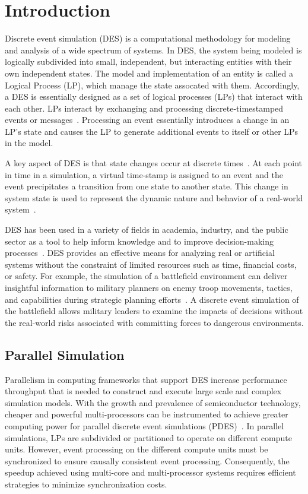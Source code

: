 \chapter{Introduction} 

Discrete event simulation (DES) is a computational methodology for
modeling and analysis of a wide spectrum of systems.  In DES, the
system being modeled is logically subdivided into small, independent,
but interacting entities with their own independent states.  The
model and implementation of an entity is called a Logical Process
(LP), which manage the state assocated with them.  Accordingly, a DES
is essentially designed as a set of logical processes (LPs) that
interact with each other.  LPs interact by exchanging and processing
discrete-timestamped events or messages~\cite{jafer-13}.  Processing
an event essentially introduces a change in an LP's state and causes
the LP to generate additional events to itself or other LPs in the
model.

A key aspect of DES is that state changes occur at discrete
times~\cite{fishman-13}.  At each point in time in a simulation, a
virtual time-stamp is assigned to an event and the event precipitates
a transition from one state to another state. This change in system
state is used to represent the dynamic nature and behavior of a
real-world system~\cite{fujimoto-90}.

DES has been used in a variety of fields in academia, industry, and the
public sector as a tool to help inform knowledge and to improve
decision-making processes~\cite{fishman-13}. DES provides an effective
means for analyzing real or artificial systems without the constraint
of limited resources such as time, financial costs, or safety. For
example, the simulation of a battlefield environment can deliver
insightful information to military planners on enemy troop movements,
tactics, and capabilities during strategic planning
efforts~\cite{hill-01}. A discrete event simulation of the battlefield
allows military leaders to examine the impacts of decisions without
the real-world risks associated with committing forces to dangerous
environments.

\section{Parallel Simulation}

Parallelism in computing frameworks that support DES increase
performance throughput that is needed to construct and execute large
scale and complex simulation models. With the growth and prevalence of
semiconductor technology, cheaper and powerful multi-processors can be
instrumented to achieve greater computing power for parallel discrete
event simulations (PDES)~\cite{pacheco2011introduction, bryant2003computer}.  In parallel simulations, LPs are subdivided
or partitioned to operate on different compute units.  However, event
processing on the different compute units must be synchronized to
ensure causally consistent event processing.  Consequently, the
speedup achieved using multi-core and multi-processor systems requires
efficient strategies to minimize synchronization costs.

